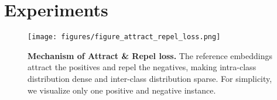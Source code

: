 \section{Experiments}
    \label{section:experiments}
    \begin{figure}[t!]
        \centering
        \texttt{[image: figures/figure\_attract\_repel\_loss.png]}
        \captionsetup{font=footnotesize}
        \caption{
            \textbf{Mechanism of Attract \& Repel loss.} The reference embeddings attract the positives and repel the negatives, making intra-class distribution dense and inter-class distribution sparse. For simplicity, we visualize only one positive and negative instance.
        }
        \label{fig:attract_repel_loss}
    \end{figure}
        
